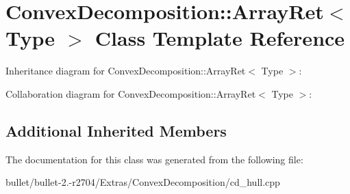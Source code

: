 \hypertarget{singleton_convex_decomposition_1_1_array_ret}{\section{Convex\+Decomposition\+:\+:Array\+Ret$<$ Type $>$ Class Template Reference}
\label{singleton_convex_decomposition_1_1_array_ret}
}


Inheritance diagram for Convex\+Decomposition\+:\+:Array\+Ret$<$ Type $>$\+:


Collaboration diagram for Convex\+Decomposition\+:\+:Array\+Ret$<$ Type $>$\+:
\subsection*{Additional Inherited Members}


The documentation for this class was generated from the following file\+:\begin{DoxyCompactItemize}
\item 
bullet/bullet-\/2.-\/r2704/\+Extras/\+Convex\+Decomposition/cd\+\_\+hull.\+cpp\end{DoxyCompactItemize}
